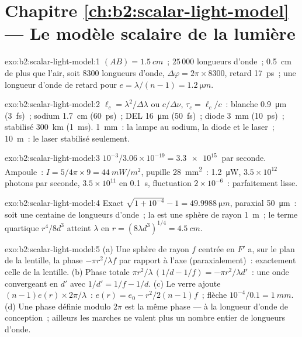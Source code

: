 \section*{Chapitre \ref{ch:b2:scalar-light-model} --- Le modèle scalaire de la lumière}

\begin{solution}{exo:b2:scalar-light-model:1}
$(AB) = \qty{1.5}{cm}$~; $25\,000$ longueurs d'onde~; \qty{0.5}{cm} de plus que l'air, soit $8300$
longueurs d'onde, $\Delta\varphi = 2\pi \times 8300$, retard \qty{17}{ps}~; une longueur d'onde de
retard pour $e = \lambda/(n - 1) = \qty{1.2}{\micro m}$.
\end{solution}

\begin{solution}{exo:b2:scalar-light-model:2}
$\ell_c = \lambda^2/\Delta\lambda$ ou $c/\Delta\nu$, $\tau_c = \ell_c/c$~: blanche \qty{0.9}{\micro m} (\qty{3}{fs})~;
sodium \qty{1.7}{cm} (\qty{60}{ps})~; DEL \qty{16}{\micro m} (\qty{50}{fs})~; diode \qty{3}{mm}
(\qty{10}{ps})~; stabilisé \qty{300}{km} (\qty{1}{ms}). \qty{1}{mm}~: la lampe au sodium,
la diode et le laser~; \qty{10}{m}~: le laser stabilisé seulement.
\end{solution}

\begin{solution}{exo:b2:scalar-light-model:3}
$10^{-3}/3.06 \times 10^{-19} = \qty{3.3e15}{}$ par seconde. Ampoule~: $I = 5/4\pi \times 9 =
\qty{44}{mW/m^2}$, pupille \qty{28}{mm^2}~: \qty{1.2}{\micro W}, $3.5 \times 10^{12}$ photons par seconde,
$3.5 \times 10^{11}$ en \qty{0.1}{s}, fluctuation $2 \times 10^{-6}$~: parfaitement lisse.
\end{solution}

\begin{solution}{exo:b2:scalar-light-model:4}
Exact $\sqrt{1 + 10^{-4}} - 1 = \qty{49.9988}{\micro m}$, paraxial \qty{50}{\micro m}~: soit une
centaine de longueurs d'onde~; la  est une sphère de rayon \qty{1}{m}~; le
terme quartique $r^4/8d^3$ atteint $\lambda$ en $r = (8\lambda d^3)^{1/4} = \qty{4.5}{cm}$.
\end{solution}

\begin{solution}{exo:b2:scalar-light-model:5}
(a) Une sphère de rayon $f$ centrée en $F'$ a, sur le plan de la lentille, la
phase $-\pi r^2/\lambda f$ par rapport à l'axe (paraxialement)~: exactement celle de
la lentille. (b) Phase totale $\pi r^2/\lambda\,(1/d - 1/f) = -\pi r^2/\lambda d'$~: une onde
convergeant en $d'$ avec $1/d' = 1/f - 1/d$. (c) Le verre ajoute $(n - 1)e(r)
\times2\pi/\lambda$~: $e(r) = e_0 - r^2/2(n - 1)f$~; flèche $10^{-4}/0.1 = \qty{1}{mm}$. (d) Une
phase définie modulo $2\pi$ est la même phase --- à la longueur d'onde de
conception~; ailleurs les marches ne valent plus un nombre entier de longueurs d'onde.
\end{solution}

